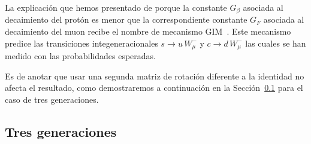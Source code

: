 \begin{frame}
La explicación que hemos presentado de porque la constante $G_\beta$ asociada al decaimiento del protón es menor que la correspondiente constante $G_F$ asociada al decaimiento del muon recibe el nombre de mecanismo GIM~\cite{}. Este mecanismo predice las transiciones integeneracionales $s \to u \,W_\mu^-$ y $c \to d \,W_\mu^-$ las cuales se han medido con las probabilidades esperadas.

 Es de anotar que usar una segunda matriz de rotación diferente a la identidad no afecta el resultado, como demostraremos a continuación en la Sección~\ref{sec:tres-generaciones} para el caso de tres generaciones.
\end{frame}
\subsection{Tres generaciones}
\label{sec:tres-generaciones}


